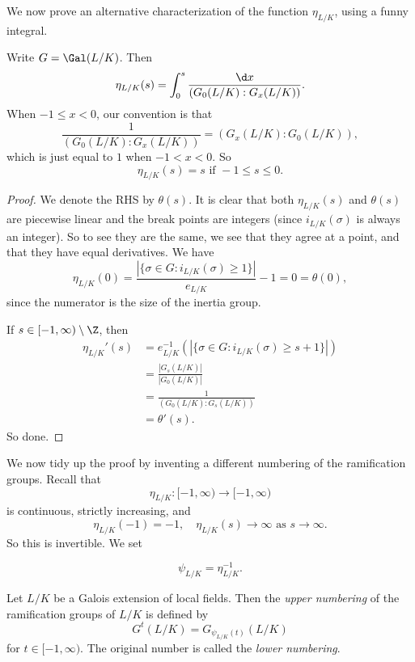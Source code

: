 \documentclass[a4paper]{article}
\begin{document}
We now prove an alternative characterization of the function $\eta_{L/K}$, using a funny integral.
\begin{prop}
  Write $G = \Gal(L/K)$. Then
  \[
    \eta_{L/K}(s) = \int_0^s \frac{\d x}{(G_0(L/K): G_x(L/K))}.
  \]
  When $-1 \leq x < 0$, our convention is that
  \[
    \frac{1}{(G_0(L/K):G_x(L/K))} = (G_x(L/K): G_0(L/K)),
  \]
  which is just equal to $1$ when $-1 < x < 0$. So
  \[
    \eta_{L/K}(s) = s\text{ if }-1 \leq s \leq 0.
  \]
\end{prop}

\begin{proof}
  We denote the RHS by $\theta(s)$. It is clear that both $\eta_{L/K}(s)$ and $\theta(s)$ are piecewise linear and the break points are integers (since $i_{L/K}(\sigma)$ is always an integer). So to see they are the same, we see that they agree at a point, and that they have equal derivatives. We have
  \[
    \eta_{L/K}(0) = \frac{|\{\sigma \in G: i_{L/K}(\sigma) \geq 1\}|}{e_{L/K}} - 1 = 0 = \theta(0),
  \]
  since the numerator is the size of the inertia group.

  If $s \in [-1, \infty) \setminus \Z$, then
  \begin{align*}
    \eta_{L/K}'(s) &= e_{L/K}^{-1} (|\{\sigma \in G: i_{L/K}(\sigma) \geq s + 1\}|) \\
    &= \frac{|G_s(L/K)|}{|G_0(L/K)|} \\
    &= \frac{1}{(G_0(L/K):G_s(L/K))} \\
    &= \theta'(s).
  \end{align*}
  So done.
\end{proof}


We now tidy up the proof by inventing a different numbering of the ramification groups. Recall that
\[
  \eta_{L/K}: [-1, \infty) \to [-1, \infty)
\]
is continuous, strictly increasing, and
\[
  \eta_{L/K}(-1) = -1,\quad \eta_{L/K}(s) \to \infty\text{ as } s \to \infty.
\]
So this is invertible. We set
\begin{notation}
  \[
    \psi_{L/K} = \eta_{L/K}^{-1}.
  \]
\end{notation}

\begin{defi}
  Let $L/K$ be a Galois extension of local fields. Then the \emph{upper numbering} of the ramification groups of $L/K$ is defined by
  \[
    G^t(L/K) = G_{\psi_{L/K}(t)} (L/K)
  \]
  for $t \in [-1, \infty)$. The original number is called the \emph{lower numbering}.
\end{defi}
\end{document}
